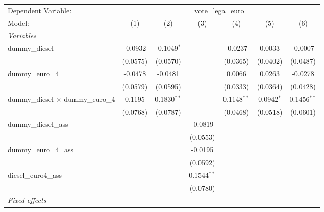 \begingroup
\centering
\begin{tabular}{lcccccc}
   \tabularnewline \midrule \midrule
   Dependent Variable: & \multicolumn{6}{c}{vote\_lega\_euro}\\
   Model:                                    & (1)      & (2)           & (3)           & (4)           & (5)          & (6)\\  
   \midrule
   \emph{Variables}\\
   dummy\_diesel                             & -0.0932  & -0.1049$^{*}$ &               & -0.0237       & 0.0033       & -0.0007\\   
                                             & (0.0575) & (0.0570)      &               & (0.0365)      & (0.0402)     & (0.0487)\\   
   dummy\_euro\_4                            & -0.0478  & -0.0481       &               & 0.0066        & 0.0263       & -0.0278\\   
                                             & (0.0579) & (0.0595)      &               & (0.0333)      & (0.0364)     & (0.0428)\\   
   dummy\_diesel $\times$ dummy\_euro\_4     & 0.1195   & 0.1830$^{**}$ &               & 0.1148$^{**}$ & 0.0942$^{*}$ & 0.1456$^{**}$\\   
                                             & (0.0768) & (0.0787)      &               & (0.0468)      & (0.0518)     & (0.0601)\\   
   dummy\_diesel\_ass                        &          &               & -0.0819       &               &              &   \\   
                                             &          &               & (0.0553)      &               &              &   \\   
   dummy\_euro\_4\_ass                       &          &               & -0.0195       &               &              &   \\   
                                             &          &               & (0.0592)      &               &              &   \\   
   diesel\_euro4\_ass                        &          &               & 0.1544$^{**}$ &               &              &   \\   
                                             &          &               & (0.0780)      &               &              &   \\   
   \midrule
   \emph{Fixed-effects}\\

\end{tabular}
